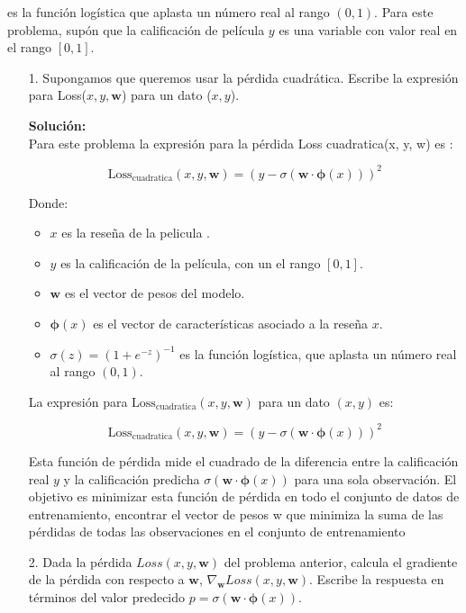 \documentclass[11pt,letterpaper]{article}
\newenvironment{solution}{%
  \noindent\begin{shaded}
  \textbf{Solución:}\ }{
  \end{shaded}%
}
\begin{document}
es la función logística que aplasta un número real al rango $(0, 1)$. Para este problema, supón que la calificación de película $y$ es una variable con valor real en el rango $[0, 1]$.
\begin{enumerate}
\item[1.]
Supongamos que queremos usar la pérdida cuadrática. Escribe la expresión para Loss($x,y, \mathbf{w}$) para un dato ($x,y$).


\begin{solution}
  \\ Para este problema la expresión para la pérdida Loss cuadratica(x, y, w) es    :

\[
\text{Loss}_{\text{cuadratica}}(x, y, \mathbf{w}) = (y - \sigma(\mathbf{w} \cdot \boldsymbol{\phi}(x)))^2
\]

Donde:
\begin{itemize}
    \item \( x \) es la reseña de la pelicula .
    \item \( y \) es la calificación de la película, con un el rango \( [0, 1] \).
    \item \( \mathbf{w} \) es el vector de pesos del modelo.
    \item \( \boldsymbol{\phi}(x) \) es el vector de características asociado a la reseña \( x \).
    \item \( \sigma(z) = (1 + e^{-z})^{-1} \) es la función logística, que aplasta un número real al rango \( (0, 1) \).
\end{itemize}

La expresión para \( \text{Loss}_{\text{cuadratica}}(x, y, \mathbf{w}) \) para un dato \( (x, y) \) es:

\[
\text{Loss}_{\text{cuadratica}}(x, y, \mathbf{w}) = (y - \sigma(\mathbf{w} \cdot \boldsymbol{\phi}(x)))^2
\]

Esta función de pérdida mide el cuadrado de la diferencia entre la calificación real \( y \) y la calificación predicha \( \sigma(\mathbf{w} \cdot \boldsymbol{\phi}(x)) \) para una sola observación. El objetivo es minimizar esta función de pérdida en todo el conjunto de datos de entrenamiento, encontrar el vector de pesos w que minimiza la suma de las pérdidas de todas las observaciones en el conjunto de entrenamiento 

\end{solution}

\item[2.]
 Dada la pérdida $Loss(x, y, \mathbf{w})$ del problema anterior, calcula el gradiente de la pérdida con respecto a $\mathbf{w}$, $\nabla_{\mathbf{w}}Loss(x, y, \mathbf{w})$. Escribe la respuesta en términos del valor predecido $p = \sigma(\mathbf{w} \cdot \boldsymbol{\phi}(x))$.


\end{enumerate}
\end{document}
